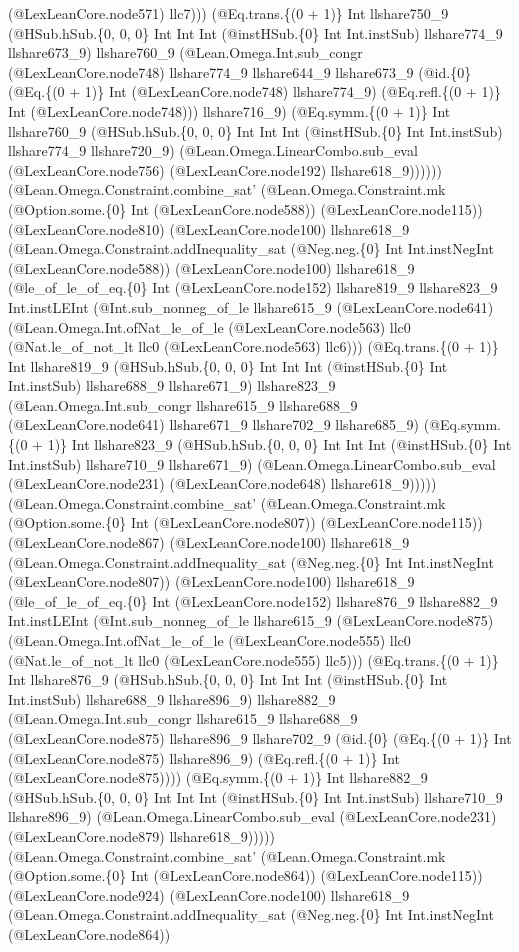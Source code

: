 \documentclass[11pt]{article}
\begin{document}
(@LexLeanCore.node571) llc7))) (@Eq.trans.\{(0 + 1)\} Int llshare750\_9 (@HSub.hSub.\{0, 0, 0\} Int Int Int (@instHSub.\{0\} Int Int.instSub) llshare774\_9 llshare673\_9) llshare760\_9 (@Lean.Omega.Int.sub\_congr (@LexLeanCore.node748) llshare774\_9 llshare644\_9 llshare673\_9 (@id.\{0\} (@Eq.\{(0 + 1)\} Int (@LexLeanCore.node748) llshare774\_9) (@Eq.refl.\{(0 + 1)\} Int (@LexLeanCore.node748))) llshare716\_9) (@Eq.symm.\{(0 + 1)\} Int llshare760\_9 (@HSub.hSub.\{0, 0, 0\} Int Int Int (@instHSub.\{0\} Int Int.instSub) llshare774\_9 llshare720\_9) (@Lean.Omega.LinearCombo.sub\_eval (@LexLeanCore.node756) (@LexLeanCore.node192) llshare618\_9)))))) (@Lean.Omega.Constraint.combine\_sat' (@Lean.Omega.Constraint.mk (@Option.some.\{0\} Int (@LexLeanCore.node588)) (@LexLeanCore.node115)) (@LexLeanCore.node810) (@LexLeanCore.node100) llshare618\_9 (@Lean.Omega.Constraint.addInequality\_sat (@Neg.neg.\{0\} Int Int.instNegInt (@LexLeanCore.node588)) (@LexLeanCore.node100) llshare618\_9 (@le\_of\_le\_of\_eq.\{0\} Int (@LexLeanCore.node152) llshare819\_9 llshare823\_9 Int.instLEInt (@Int.sub\_nonneg\_of\_le llshare615\_9 (@LexLeanCore.node641) (@Lean.Omega.Int.ofNat\_le\_of\_le (@LexLeanCore.node563) llc0 (@Nat.le\_of\_not\_lt llc0 (@LexLeanCore.node563) llc6))) (@Eq.trans.\{(0 + 1)\} Int llshare819\_9 (@HSub.hSub.\{0, 0, 0\} Int Int Int (@instHSub.\{0\} Int Int.instSub) llshare688\_9 llshare671\_9) llshare823\_9 (@Lean.Omega.Int.sub\_congr llshare615\_9 llshare688\_9 (@LexLeanCore.node641) llshare671\_9 llshare702\_9 llshare685\_9) (@Eq.symm.\{(0 + 1)\} Int llshare823\_9 (@HSub.hSub.\{0, 0, 0\} Int Int Int (@instHSub.\{0\} Int Int.instSub) llshare710\_9 llshare671\_9) (@Lean.Omega.LinearCombo.sub\_eval (@LexLeanCore.node231) (@LexLeanCore.node648) llshare618\_9))))) (@Lean.Omega.Constraint.combine\_sat' (@Lean.Omega.Constraint.mk (@Option.some.\{0\} Int (@LexLeanCore.node807)) (@LexLeanCore.node115)) (@LexLeanCore.node867) (@LexLeanCore.node100) llshare618\_9 (@Lean.Omega.Constraint.addInequality\_sat (@Neg.neg.\{0\} Int Int.instNegInt (@LexLeanCore.node807)) (@LexLeanCore.node100) llshare618\_9 (@le\_of\_le\_of\_eq.\{0\} Int (@LexLeanCore.node152) llshare876\_9 llshare882\_9 Int.instLEInt (@Int.sub\_nonneg\_of\_le llshare615\_9 (@LexLeanCore.node875) (@Lean.Omega.Int.ofNat\_le\_of\_le (@LexLeanCore.node555) llc0 (@Nat.le\_of\_not\_lt llc0 (@LexLeanCore.node555) llc5))) (@Eq.trans.\{(0 + 1)\} Int llshare876\_9 (@HSub.hSub.\{0, 0, 0\} Int Int Int (@instHSub.\{0\} Int Int.instSub) llshare688\_9 llshare896\_9) llshare882\_9 (@Lean.Omega.Int.sub\_congr llshare615\_9 llshare688\_9 (@LexLeanCore.node875) llshare896\_9 llshare702\_9 (@id.\{0\} (@Eq.\{(0 + 1)\} Int (@LexLeanCore.node875) llshare896\_9) (@Eq.refl.\{(0 + 1)\} Int (@LexLeanCore.node875)))) (@Eq.symm.\{(0 + 1)\} Int llshare882\_9 (@HSub.hSub.\{0, 0, 0\} Int Int Int (@instHSub.\{0\} Int Int.instSub) llshare710\_9 llshare896\_9) (@Lean.Omega.LinearCombo.sub\_eval (@LexLeanCore.node231) (@LexLeanCore.node879) llshare618\_9))))) (@Lean.Omega.Constraint.combine\_sat' (@Lean.Omega.Constraint.mk (@Option.some.\{0\} Int (@LexLeanCore.node864)) (@LexLeanCore.node115)) (@LexLeanCore.node924) (@LexLeanCore.node100) llshare618\_9 (@Lean.Omega.Constraint.addInequality\_sat (@Neg.neg.\{0\} Int Int.instNegInt (@LexLeanCore.node864)) 
\end{document}
